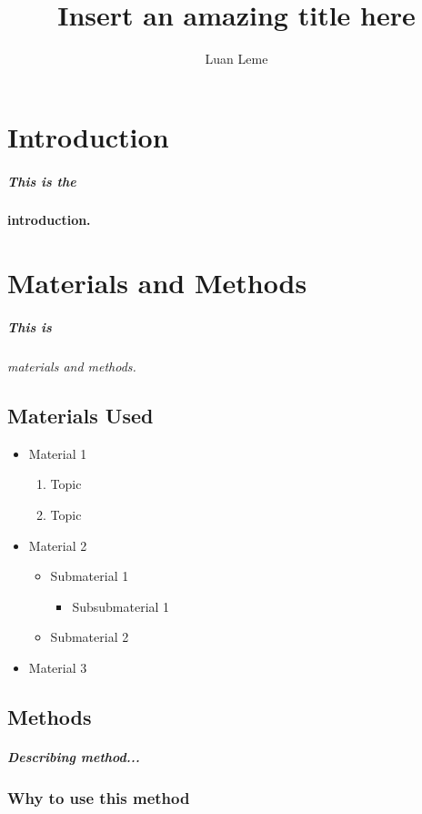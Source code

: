 \documentclass[11pt, a4paper]{article}
\title{Insert an amazing title here}
\author{Luan Leme}
\begin{document}
\maketitle

\chapter{Introduction}
\paragraph{This is the}\bf{introduction.}


\chapter{Materials and Methods}
\paragraph{This is}\it{materials and methods.}

\section{Materials Used}
\begin{itemize}
\item{Material 1}
\begin{enumerate}
\item{Topic}
\item{Topic}
\end{enumerate}
\item{Material 2}
\begin{itemize}
\item{Submaterial 1}
\begin{itemize}
\item{Subsubmaterial 1}
\end{itemize}
\item{Submaterial 2}
\end{itemize}
\item{Material 3}
\end{itemize}

\section{Methods}
\paragraph{Describing method...}
\subsection{Why to use this method}
\end{document}
